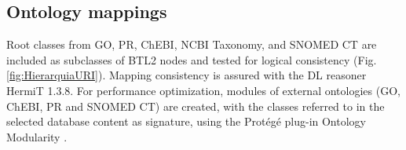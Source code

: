 \subsection{Ontology mappings}
Root classes from GO, PR, ChEBI, NCBI Taxonomy, and SNOMED CT are included as subclasses of BTL2 nodes and tested for logical consistency (Fig. \ref{fig:HierarquiaURI}).
%
%
%
Mapping consistency is assured with the DL reasoner HermiT 1.3.8. For performance optimization, modules of external ontologies (GO, ChEBI, PR and SNOMED CT) are created, with the classes 
referred to in the selected database content as signature, using the Prot\'{e}g\'{e} plug-in Ontology Modularity \citep{Jiang2011}.  


